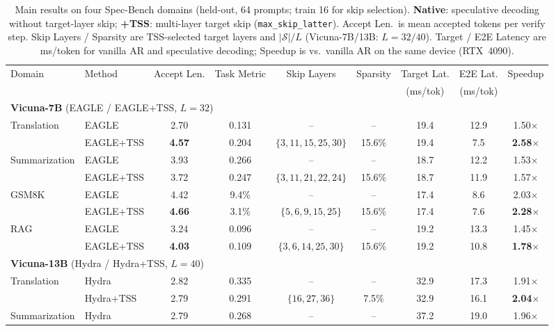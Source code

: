\begin{table}[t]
\centering
\small
\caption{Main results on four Spec-Bench domains (held-out, 64 prompts; train 16 for skip selection). \textbf{Native}: speculative decoding without target-layer skip; \textbf{+TSS}: multi-layer target skip (\texttt{max\_skip\_latter}). Accept Len.\ is mean accepted tokens per verify step. Skip Layers / Sparsity are TSS-selected target layers and $|\mathcal{S}|/L$ (Vicuna-7B/13B: $L{=}32/40$). Target / E2E Latency are ms/token for vanilla AR and speculative decoding; Speedup is vs.\ vanilla AR on the same device (RTX~4090).}
\label{tab:main_tss}
\setlength{\tabcolsep}{2.8pt}
\begin{tabular}{llccccccc}
\toprule
Domain & Method & Accept Len. & Task Metric & Skip Layers & Sparsity & Target Lat. & E2E Lat. & Speedup \\
 &  &  &  &  &  & (ms/tok) & (ms/tok) &  \\
\midrule
\multicolumn{9}{l}{\textbf{Vicuna-7B} (EAGLE / EAGLE+TSS, $L{=}32$)} \\
\midrule
Translation & EAGLE & 2.70 & 0.131 & -- & -- & 19.4 & 12.9 & 1.50$\times$ \\
 & EAGLE+TSS & \textbf{4.57} & 0.204 & $\{3,11,15,25,30\}$ & 15.6\% & 19.4 & 7.5 & \textbf{2.58$\times$} \\
Summarization & EAGLE & 3.93 & 0.266 & -- & -- & 18.7 & 12.2 & 1.53$\times$ \\
 & EAGLE+TSS & 3.72 & 0.247 & $\{3,11,21,22,24\}$ & 15.6\% & 18.7 & 11.9 & 1.57$\times$ \\
GSM8K & EAGLE & 4.42 & 9.4\% & -- & -- & 17.4 & 8.6 & 2.03$\times$ \\
 & EAGLE+TSS & \textbf{4.66} & 3.1\% & $\{5,6,9,15,25\}$ & 15.6\% & 17.4 & 7.6 & \textbf{2.28$\times$} \\
RAG & EAGLE & 3.24 & 0.096 & -- & -- & 19.2 & 13.3 & 1.45$\times$ \\
 & EAGLE+TSS & \textbf{4.03} & 0.109 & $\{3,6,14,25,30\}$ & 15.6\% & 19.2 & 10.8 & \textbf{1.78$\times$} \\
\midrule
\multicolumn{9}{l}{\textbf{Vicuna-13B} (Hydra / Hydra+TSS, $L{=}40$)} \\
\midrule
Translation & Hydra & 2.82 & 0.335 & -- & -- & 32.9 & 17.3 & 1.91$\times$ \\
 & Hydra+TSS & 2.79 & 0.291 & $\{16,27,36\}$ & 7.5\% & 32.9 & 16.1 & \textbf{2.04$\times$} \\
Summarization & Hydra & 2.79 & 0.268 & -- & -- & 37.2 & 19.0 & 1.96$\times$ \\

\end{tabular}
\end{table}
